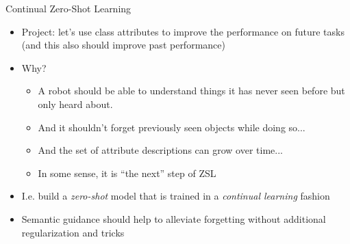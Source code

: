 \documentclass[handout, 10pt]{beamer}
\begin{document}
\begin{frame}{Continual Zero-Shot Learning}
    \begin{itemize}
        \item\pause Project: let's use class attributes to improve the performance on future tasks (and this also should improve past performance)
        \item\pause Why?
            \begin{itemize}
                \item\pause A robot should be able to understand things it has never seen before but only heard about.
                \item\pause And it shouldn't forget previously seen objects while doing so...
                \item\pause And the set of attribute descriptions can grow over time...
                \item\pause In some sense, it is ``the next'' step of ZSL
            \end{itemize}
        \item\pause I.e. build a \textit{zero-shot} model that is trained in a \textit{continual learning} fashion
        \item\pause Semantic guidance should help to alleviate forgetting without additional regularization and tricks
    \end{itemize}
\end{frame}

\end{document}
